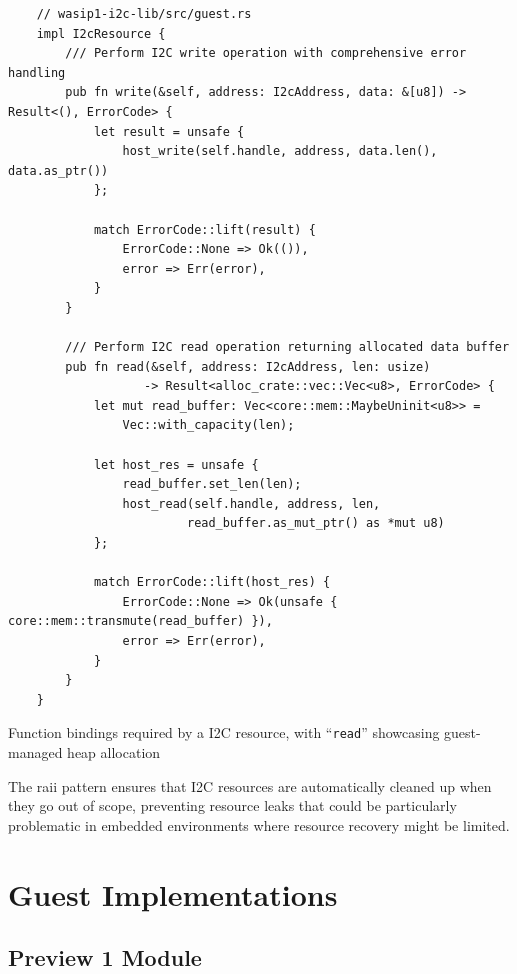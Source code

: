\begin{listing}[H]
    \begin{verbatim}
    // wasip1-i2c-lib/src/guest.rs
    impl I2cResource {
        /// Perform I2C write operation with comprehensive error handling
        pub fn write(&self, address: I2cAddress, data: &[u8]) -> Result<(), ErrorCode> {
            let result = unsafe {
                host_write(self.handle, address, data.len(), data.as_ptr())
            };
            
            match ErrorCode::lift(result) {
                ErrorCode::None => Ok(()),
                error => Err(error),
            }
        }
    
        /// Perform I2C read operation returning allocated data buffer
        pub fn read(&self, address: I2cAddress, len: usize) 
                   -> Result<alloc_crate::vec::Vec<u8>, ErrorCode> {
            let mut read_buffer: Vec<core::mem::MaybeUninit<u8>> = 
                Vec::with_capacity(len);
    
            let host_res = unsafe {
                read_buffer.set_len(len);
                host_read(self.handle, address, len, 
                         read_buffer.as_mut_ptr() as *mut u8)
            };
    
            match ErrorCode::lift(host_res) {
                ErrorCode::None => Ok(unsafe { core::mem::transmute(read_buffer) }),
                error => Err(error),
            }
        }
    }
    \end{verbatim}
    \caption{Function bindings required by a I2C resource, with ``\texttt{read}'' showcasing guest-managed heap allocation}
    \label{lst:guest-resource-management}
\end{listing}

The \acrshort{raii} pattern ensures that I2C resources are automatically cleaned up when they go out of scope, preventing resource leaks that could be particularly problematic in embedded environments where resource recovery might be limited.

\section{Guest Implementations}
\label{sec:guest-implementations}

\subsection{Preview 1 Module}

